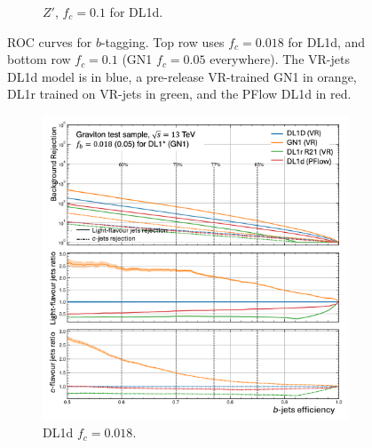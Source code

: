 \begin{figure}[h!]
\begin{subfigure}[t]{0.48\textwidth}
    \caption{$Z'$, $f_c = 0.1$ for DL1d.}
    \label{fig:dl1dVRROCzpc}
  \end{subfigure}
  \caption{ROC curves for $b$-tagging. Top row uses $f_c = 0.018$ for DL1d, and bottom row $f_c = 0.1$ (GN1 $f_c = 0.05$ everywhere). The VR-jets DL1d model is in blue, a pre-release VR-trained GN1 in orange, DL1r trained on VR-jets in green, and the PFlow DL1d in red.}
  \label{fig:dl1dVRROC}
\end{figure}
\vspace*{\fill}

\newpage
\vspace*{\fill}
\begin{figure}[h!]
  \centering
  \begin{subfigure}[t]{0.48\textwidth}
    \centering
    \includegraphics[width=\textwidth]{Images/FTAG/VRDL1d/ROC/grb.png}
    \caption{DL1d $f_c = 0.018$.}
    \label{fig:dl1dVRROCgr}
  \end{subfigure}
  \begin{subfigure}[t]{0.48\textwidth}
    \centering

\end{subfigure}
\end{figure}
